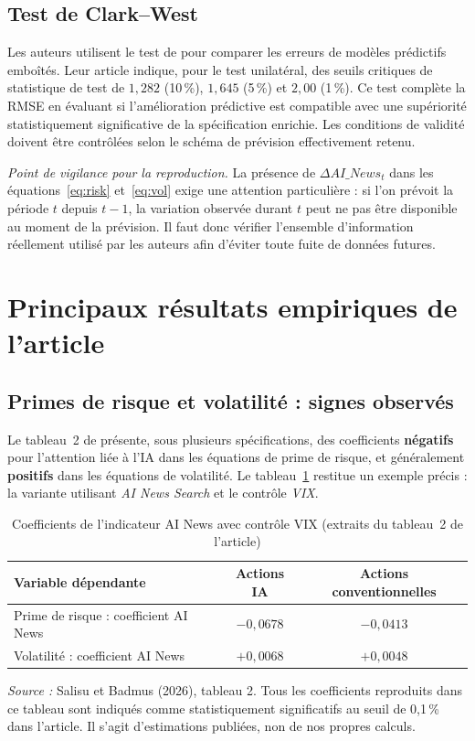 \documentclass[11pt,a4paper]{article}
\newcommand{\notereproduction}{\textit{Point de vigilance pour la reproduction.} }
\begin{document}
\subsection{Test de Clark--West}
Les auteurs utilisent le test de \cite{ClarkWest2007} pour comparer les erreurs de modèles prédictifs emboîtés. Leur article indique, pour le test unilatéral, des seuils critiques de statistique de test de $1{,}282$ (10\,\%), $1{,}645$ (5\,\%) et $2{,}00$ (1\,\%). Ce test complète la RMSE en évaluant si l'amélioration prédictive est compatible avec une supériorité statistiquement significative de la spécification enrichie. Les conditions de validité doivent être contrôlées selon le schéma de prévision effectivement retenu.

\notereproduction La présence de $\Delta AI\_News_t$ dans les équations~\eqref{eq:risk} et~\eqref{eq:vol} exige une attention particulière : si l'on prévoit la période $t$ depuis $t-1$, la variation observée durant $t$ peut ne pas être disponible au moment de la prévision. Il faut donc vérifier l'ensemble d'information réellement utilisé par les auteurs afin d'éviter toute fuite de données futures.

\section{Principaux résultats empiriques de l'article}
\subsection{Primes de risque et volatilité : signes observés}
Le tableau~2 de \cite{SalisuBadmus2026} présente, sous plusieurs spécifications, des coefficients \textbf{négatifs} pour l'attention liée à l'IA dans les équations de prime de risque, et généralement \textbf{positifs} dans les équations de volatilité. Le tableau~\ref{tab:coeff} restitue un exemple précis : la variante utilisant \emph{AI News Search} et le contrôle \emph{VIX}.

\begin{table}[H]
\centering\small
\caption{Coefficients de l'indicateur AI News avec contrôle VIX (extraits du tableau~2 de l'article)}
\label{tab:coeff}
\begin{tabularx}{\textwidth}{@{}Xcc@{}}
\toprule
\textbf{Variable dépendante} & \textbf{Actions IA} & \textbf{Actions conventionnelles}\\
\midrule
Prime de risque : coefficient AI News & $-0{,}0678$ & $-0{,}0413$\\
Volatilité : coefficient AI News & $+0{,}0068$ & $+0{,}0048$\\
\bottomrule
\end{tabularx}
\vspace{0.1cm}
\parbox{\textwidth}{\footnotesize \emph{Source :} Salisu et Badmus (2026), tableau 2. Tous les coefficients reproduits dans ce tableau sont indiqués comme statistiquement significatifs au seuil de 0,1\,\% dans l'article. Il s'agit d'estimations publiées, non de nos propres calculs.}
\end{table}
\end{document}
